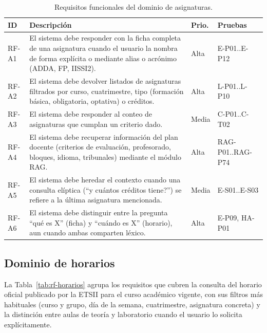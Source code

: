 \begin{table}[hbtp]
\centering
\small
\caption{Requisitos funcionales del dominio de asignaturas.}\label{tab:rf-asignaturas}
\begin{tabular}{|p{1.1cm}|p{8.2cm}|p{1.0cm}|p{2.0cm}|}
\hline
\textbf{ID} & \textbf{Descripción} & \textbf{Prio.} & \textbf{Pruebas} \\ \hline
RF-A1 & El sistema debe responder con la ficha completa de una asignatura cuando el usuario la nombra de forma explícita o mediante alias o acrónimo (ADDA, FP, IISSI2). & Alta & E-P01..E-P12 \\ \hline
RF-A2 & El sistema debe devolver listados de asignaturas filtrados por curso, cuatrimestre, tipo (formación básica, obligatoria, optativa) o créditos. & Alta & L-P01..L-P10 \\ \hline
RF-A3 & El sistema debe responder al conteo de asignaturas que cumplan un criterio dado. & Media & C-P01..C-T02 \\ \hline
RF-A4 & El sistema debe recuperar información del plan docente (criterios de evaluación, profesorado, bloques, idioma, tribunales) mediante el módulo RAG. & Alta & RAG-P01..RAG-P74 \\ \hline
RF-A5 & El sistema debe heredar el contexto cuando una consulta elíptica (``y cuántos créditos tiene?'') se refiere a la última asignatura mencionada. & Media & E-S01..E-S03 \\ \hline
RF-A6 & El sistema debe distinguir entre la pregunta ``qué es X'' (ficha) y ``cuándo es X'' (horario), aun cuando ambas comparten léxico. & Alta & E-P09, HA-P01 \\ \hline
\end{tabular}
\end{table}

\subsection{Dominio de horarios}\label{subsec:rf-horarios}

La Tabla~\ref{tab:rf-horarios} agrupa los requisitos que cubren la consulta del horario oficial publicado por la ETSII para el curso académico vigente, con sus filtros más habituales (curso y grupo, día de la semana, cuatrimestre, asignatura concreta) y la distinción entre aulas de teoría y laboratorio cuando el usuario lo solicita explícitamente.


